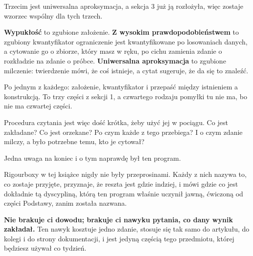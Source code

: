 \begin{fr}
Trzecim jest uniwersalna aproksymacja, a sekcja 3 już ją rozłożyła, więc
zostaje wzorzec wspólny dla tych trzech.

\begin{aibox}
\textbf{Wypukłość} to zgubione założenie. \textbf{Z wysokim
prawdopodobieństwem} to zgubiony kwantyfikator \dash{} ograniczenie jest
kwantyfikowane po losowaniach danych, a cytowanie go o zbiorze, który masz w
ręku, po cichu zamienia zdanie o rozkładzie na zdanie o próbce.
\textbf{Uniwersalna aproksymacja} to zgubione milczenie: twierdzenie mówi, że
coś istnieje, a cytat sugeruje, że da się to znaleźć.

Po jednym z każdego: założenie, kwantyfikator i przepaść między istnieniem a
konstrukcją. To trzy części z sekcji 1, a czwartego rodzaju pomyłki tu nie
ma, bo nie ma czwartej części.
\end{aibox}

Procedura czytania jest więc dość krótka, żeby użyć jej w pociągu. Co jest
zakładane? Co jest orzekane? Po czym każde z tego przebiega? I o czym zdanie
milczy, a było potrzebne temu, kto je cytował?
\end{fr}

\begin{fr}
Jedna uwaga na koniec i o tym naprawdę był ten program.

Rigourboxy w tej książce nigdy nie były przeprosinami. Każdy z nich nazywa
to, co zostaje przyjęte, przyznaje, że reszta jest gdzie indziej, i mówi gdzie
\dash{} co jest dokładnie tą dyscypliną, którą ten program właśnie uczynił
jawną, ćwiczoną od części Podstawy, zanim została nazwana.

\textbf{Nie brakuje ci dowodu; brakuje ci nawyku pytania, co dany wynik
zakładał.} Ten nawyk kosztuje jedno zdanie, stosuje się tak samo do artykułu,
do kolegi i do strony dokumentacji, i jest jedyną częścią tego przedmiotu,
której będziesz używał co tydzień.
\end{fr}

